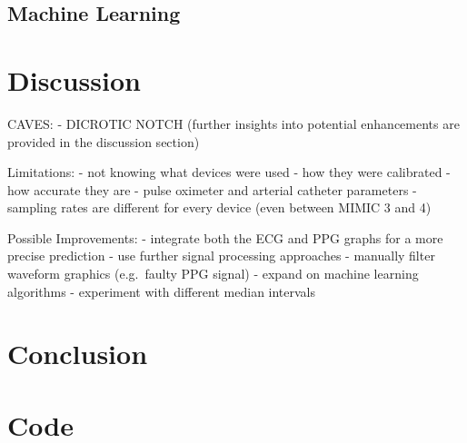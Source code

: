 \documentclass[12pt, bibliography=totoc]{scrartcl}
\begin{document}
    \subsection{Machine Learning}
    \label{subsec:machine_learning}


    \section{Discussion}
    \label{sec:discussion}

    CAVES:
    - DICROTIC NOTCH (further insights into potential enhancements are provided in the discussion section)

    Limitations:
    - not knowing what devices were used
    - how they were calibrated
    - how accurate they are
    - pulse oximeter and arterial catheter parameters
    - sampling rates are different for every device (even between MIMIC 3 and 4)

    Possible Improvements:
    - integrate both the ECG and PPG graphs for a more precise prediction
    - use further signal processing approaches
    - manually filter waveform graphics (e.g.\ faulty PPG signal)
    - expand on machine learning algorithms
    - experiment with different median intervals


    \section{Conclusion}
    \label{sec:conclusion}

    \newpage

    

    \newpage
    \appendix

    \section{Code}\label{sec:code}
    
\end{document}
